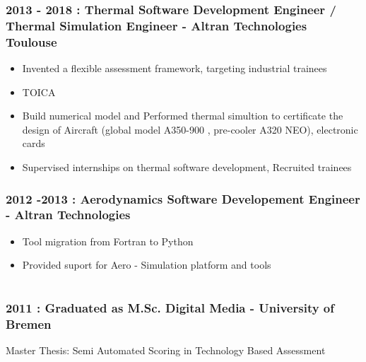 \documentclass[10pt,A4]{article}
\begin{document}
\begin{minipage}[c]{0.7\textwidth}
\subsubsection*{2013 - 2018 : Thermal Software Development Engineer / Thermal Simulation Engineer - Altran Technologies Toulouse}
\begin{itemize}
  \item Invented a flexible assessment framework, targeting industrial trainees
  \item TOICA
  \item Build numerical model and Performed thermal simultion to certificate the design of Aircraft (global model A350-900 , pre-cooler A320 NEO), electronic cards
  \item Supervised internships on thermal software development, Recruited trainees
\end{itemize}

\subsubsection*{2012 -2013 : Aerodynamics Software Developement Engineer - Altran Technologies}
\begin{itemize}
  \item Tool migration from Fortran to Python
  \item Provided suport for Aero - Simulation platform and tools
\end{itemize}


\section*{\noindent\colorbox{cyan}{}}

\subsubsection*{2011 : Graduated as M.Sc. Digital Media - University of Bremen}
Master Thesis: Semi Automated Scoring in Technology Based Assessment



\section*{\noindent\colorbox{cyan}{}}


\end{minipage}
\end{document}
